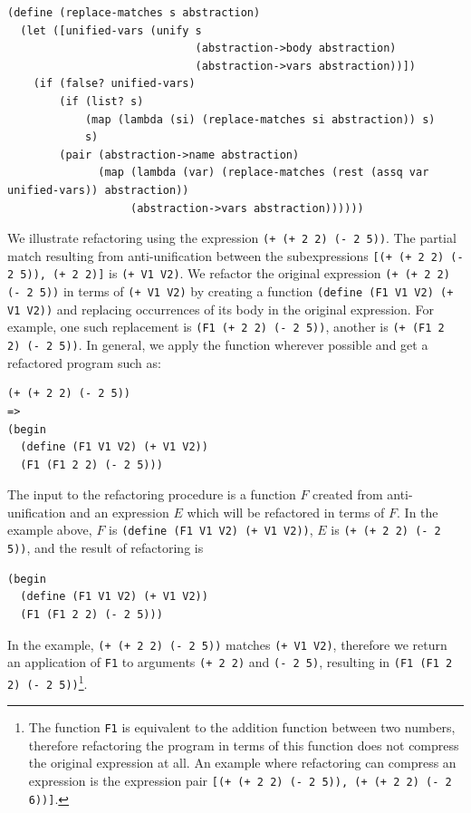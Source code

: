 \documentclass[a4paper,10pt]{article}
\begin{document}
\begin{lstlisting}[frame=trbl]
(define (replace-matches s abstraction)
  (let ([unified-vars (unify s
                             (abstraction->body abstraction)
                             (abstraction->vars abstraction))])
    (if (false? unified-vars)
        (if (list? s)
            (map (lambda (si) (replace-matches si abstraction)) s)
            s)
        (pair (abstraction->name abstraction)
              (map (lambda (var) (replace-matches (rest (assq var unified-vars)) abstraction))
                   (abstraction->vars abstraction))))))
\end{lstlisting}
We illustrate refactoring using the expression \texttt{(+ (+ 2 2) (- 2 5))}. The partial match resulting from anti-unification between the subexpressions \texttt{[(+ (+ 2 2) (- 2 5)), (+ 2 2)]} is \texttt{(+ V1 V2)}.  We refactor the original expression \texttt{(+ (+ 2 2) (- 2 5))} in terms of \texttt{(+ V1 V2)} by creating a function \texttt{(define (F1 V1 V2) (+ V1 V2))} and replacing occurrences of its body in the original expression.  For example, one such replacement is \texttt{(F1 (+ 2 2) (- 2 5))}, another is \texttt{(+ (F1 2 2) (- 2 5))}.  In general, we apply the function wherever possible and get a refactored program such as:
\begin{lstlisting}
(+ (+ 2 2) (- 2 5))
=>
(begin
  (define (F1 V1 V2) (+ V1 V2))
  (F1 (F1 2 2) (- 2 5)))
\end{lstlisting}
The input to the refactoring procedure is a function $F$ created from anti-unification and an expression $E$ which will be refactored in terms of $F$.  In the example above, $F$ is \texttt{(define (F1 V1 V2) (+ V1 V2))}, $E$ is \texttt{(+ (+ 2 2) (- 2 5))}, and the result of refactoring is
\begin{lstlisting}
(begin
  (define (F1 V1 V2) (+ V1 V2))
  (F1 (F1 2 2) (- 2 5)))
\end{lstlisting}

In the example, \texttt{(+ (+ 2 2) (- 2 5))} matches \texttt{(+ V1 V2)}, therefore we return an application of \texttt{F1} to arguments \texttt{(+ 2 2)} and \texttt{(- 2 5)}, resulting in \texttt{(F1 (F1 2 2) (- 2 5))}\footnote{The function \texttt{F1} is equivalent to the addition function between two numbers, therefore refactoring the program in terms of this function does not compress the original expression at all.  An example where refactoring can compress an expression is the expression pair \texttt{[(+ (+ 2 2) (- 2 5)), (+ (+ 2 2) (- 2 6))]}.}.
\end{document}
